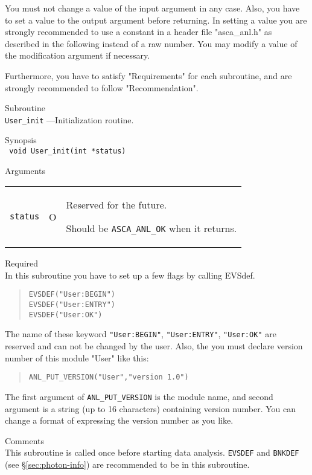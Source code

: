 You must not change a value of the input argument in any case.
Also,
you have to set a value to the output argument before returning.
In setting a value
you are strongly recommended
to use a constant in a header file "asca\_anl.h"
as described in the following
instead of a raw number.
You may modify a value of the modification argument if necessary.

Furthermore,
you have to satisfy "Requirements" for each subroutine,
and are strongly recommended to follow "Recommendation".

\newpage
\begin{description}
\item{Subroutine}\\
   {\tt User\_init} ---Initialization routine.
\item{Synopsis}\\
   {\tt
     void User\_init(int *status)
   }
\item{Arguments} \\
 \begin{tabular}{l@{\ (}c@{)\ }p{}}
   {\tt status} & O & Reserved for the future.\par
                      Should be {\tt ASCA\_ANL\_OK} when it returns.
 \end{tabular}
\item{Required} \\
   In this subroutine you have to set up a few flags by calling EVSdef.
\begin{quote}\baselineskip 3.2mm\begin{verbatim}
EVSDEF("User:BEGIN")
EVSDEF("User:ENTRY")
EVSDEF("User:OK")
\end{verbatim}\end{quote}
   The name of these keyword {\tt "User:BEGIN"}, {\tt "User:ENTRY"},
   {\tt "User:OK"} are reserved and can not be changed by the user.
   Also,
   the you must declare version number of this module "User" like this:
\begin{quote}\baselineskip 3.2mm\begin{verbatim}
ANL_PUT_VERSION("User","version 1.0")
\end{verbatim}\end{quote}
   The first argument of {\tt ANL\_PUT\_VERSION} is the module name,
   and second argument is a string (up to 16 characters)
   containing version number.
   You can change a format of expressing the version number as you like.
\item{Comments} \\
   This subroutine is called once before starting data analysis.
   {\tt EVSDEF} and {\tt BNKDEF} (see \S \ref{sec:photon-info})
   are recommended to be in this subroutine.
\end{description}


